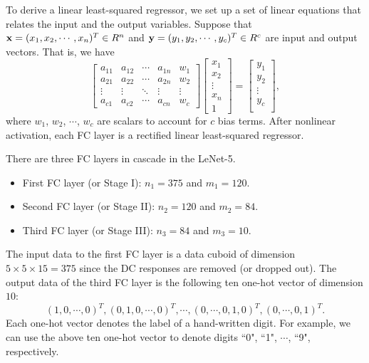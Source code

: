 \documentclass[preprint,12pt]{elsarticle}
\begin{document}
To derive a linear least-squared regressor, we set up a set of
linear equations that relates the input and the output variables.
Suppose that ${\bf x}=(x_1, x_2, \cdots, x_n)^T \in R^n$ and ${\bf
y}=(y_1, y_2, \cdots, y_c)^T \in R^c$ are input and output vectors.
That is, we have
\begin{equation}\label{eq:l3sr}
\left[
\begin{array}{ccccc}
a_{11} & a_{12} & \cdots & a_{1n} & w_1 \\
a_{21} & a_{22} & \cdots & a_{2n} & w_2 \\
\vdots & \vdots & \ddots & \vdots & \vdots \\
a_{c1} & a_{c2} & \cdots & a_{cn} & w_c
\end{array}
\right]
\left[\begin{array}{c}
x_{1} \\
x_{2} \\
\vdots \\
x_{n} \\
1
\end{array}
\right]
=
\left[\begin{array}{c}
y_{1} \\
y_{2} \\
\vdots \\
y_{c} \\
\end{array}
\right],
\end{equation}
where $w_1$, $w_2$, $\cdots$, $w_c$ are scalars to account for $c$ bias
terms.  After nonlinear activation, each FC layer is a rectified linear
least-squared regressor. 

There are three FC layers in cascade in the LeNet-5. 
\begin{itemize}
\item First FC layer (or Stage I): $n_1=375$ and $m_1=120$.
\item Second FC layer (or Stage II): $n_2=120$ and $m_2=84$.
\item Third FC layer (or Stage III): $n_3=84$ and $m_3=10$.
\end{itemize}
The input data to the first FC layer is a data cuboid of dimension $5
\times 5 \times 15=375$ since the DC responses are removed (or dropped
out). The output data of the third FC layer is the following ten one-hot
vector of dimension $10$:
\begin{equation}
(1, 0, \cdots, 0)^T, (0, 1, 0, \cdots, 0)^T, \cdots, 
(0, \cdots, 0, 1, 0)^T, (0, \cdots, 0, 1)^T.
\end{equation}
Each one-hot vector denotes the label of a hand-written digit. For
example, we can use the above ten one-hot vector to denote digits ``0",
``1", $\cdots$, ``9", respectively. 
\end{document}
